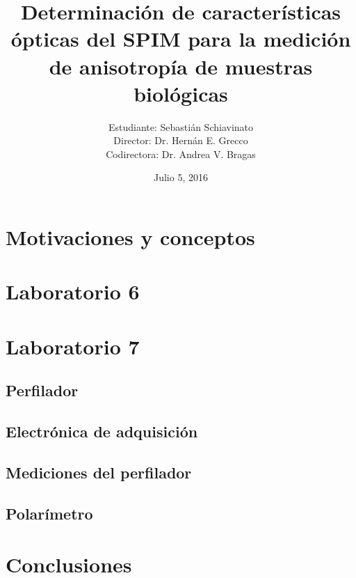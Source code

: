 \documentclass{beamer}
\author{Estudiante: {\footnotesize Sebastián Schiavinato} \\ Director: {\footnotesize Dr. Hernán E. Grecco} \\ Codirectora: {\footnotesize Dr. Andrea V. Bragas}}
\title{Determinación de características ópticas del SPIM para la medición de anisotropía de muestras biológicas}
\institute{Laboratorio 6 y 7, DF, FCEyN, UBA}
\date{Julio 5, 2016}
\begin{document}
    \begin{frame}[plain]
        \titlepage
    \end{frame}
    \section{Motivaciones y conceptos}
        
        
    \section{Laboratorio 6}
        
    \section{Laboratorio 7}
        \subsection{Perfilador}
            
        \subsection{Electrónica de adquisición}
            
        \subsection{Mediciones del perfilador}
            
        \subsection{Polarímetro}
            
    \section{Conclusiones}
        
        
\end{document}
